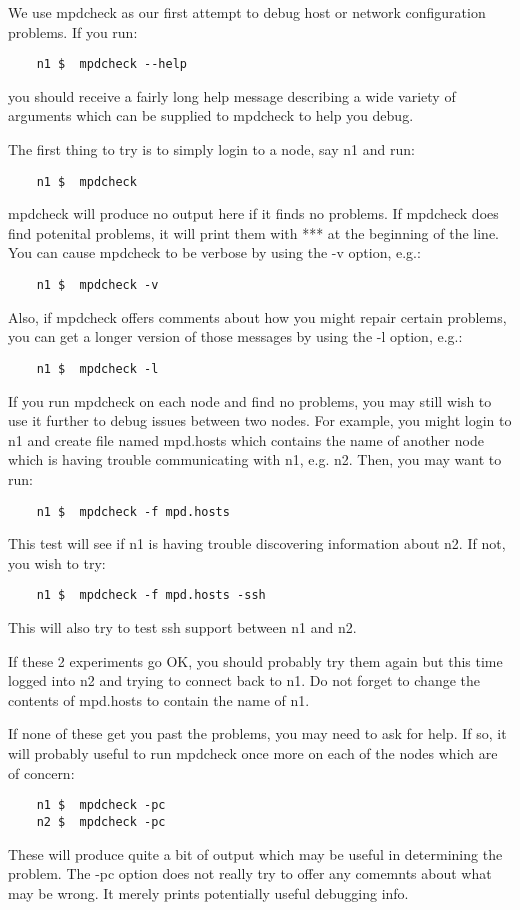 \documentclass[dvipdfm,11pt]{article}
\begin{document}
We use mpdcheck as our first attempt to debug host or network
configuration problems.  If you run:
\begin{verbatim}
    n1 $  mpdcheck --help
\end{verbatim}
you should receive a fairly long help message describing a wide variety
of arguments which can be supplied to mpdcheck to help you debug.

The first thing to try is to simply login to a node, say n1 and run:
\begin{verbatim}
    n1 $  mpdcheck
\end{verbatim}
mpdcheck will produce no output here if it finds no problems.
If mpdcheck does find potenital problems, it will print them with *** at
the beginning of the line.  You can cause mpdcheck to be verbose by using
the -v option, e.g.:
\begin{verbatim}
    n1 $  mpdcheck -v
\end{verbatim}
Also, if mpdcheck offers comments about how you might repair certain problems,
you can get a longer version of those messages by using the -l option, e.g.:
\begin{verbatim}
    n1 $  mpdcheck -l
\end{verbatim}

If you run mpdcheck on each node and find no problems, you may still wish to
use it further to debug issues between two nodes.  For example, you might
login to n1 and create file named mpd.hosts which contains the name of another
node which is having trouble communicating with n1, e.g. n2.
Then, you may want to run:
\begin{verbatim}
    n1 $  mpdcheck -f mpd.hosts
\end{verbatim}
This test will see if n1 is having trouble discovering information about
n2.  If not, you wish to try:
\begin{verbatim}
    n1 $  mpdcheck -f mpd.hosts -ssh
\end{verbatim}
This will also try to test ssh support between n1 and n2.

If these 2 experiments go OK, you should probably try them again but
this time logged into n2 and trying to connect back to n1.  Do not 
forget to change the contents of mpd.hosts to contain the name of n1.

If none of these get you past the problems, you may need to ask for help.
If so, it will probably useful to run mpdcheck once more on each of the
nodes which are of concern:
\begin{verbatim}
    n1 $  mpdcheck -pc
    n2 $  mpdcheck -pc
\end{verbatim}
These will produce quite a bit of output which may be useful in determining
the problem.  The -pc option does not really try to offer any comemnts about
what may be wrong.  It merely prints potentially useful debugging info.
\end{document}
